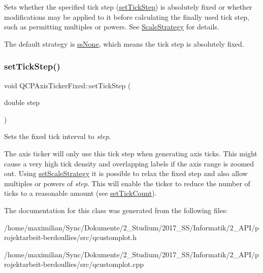 Sets whether the specified tick step (\hyperlink{class_q_c_p_axis_ticker_fixed_a4bc83d85a4f81d4abdd3fa5042d7b833}{set\+Tick\+Step}) is absolutely fixed or whether modifications may be applied to it before calculating the finally used tick step, such as permitting multiples or powers. See \hyperlink{class_q_c_p_axis_ticker_fixed_a15b3d38b935d404b1311eb85cfb6a439}{Scale\+Strategy} for details.

The default strategy is \hyperlink{class_q_c_p_axis_ticker_fixed_a15b3d38b935d404b1311eb85cfb6a439a6621275677a05caa0de204ae3956b85f}{ss\+None}, which means the tick step is absolutely fixed. \mbox{\label{class_q_c_p_axis_ticker_fixed_a4bc83d85a4f81d4abdd3fa5042d7b833}} 
\subsubsection{\texorpdfstring{set\+Tick\+Step()}{setTickStep()}}
{\footnotesize\ttfamily void Q\+C\+P\+Axis\+Ticker\+Fixed\+::set\+Tick\+Step (\begin{DoxyParamCaption}\item[{double}]{step }\end{DoxyParamCaption})}

Sets the fixed tick interval to {\itshape step}.

The axis ticker will only use this tick step when generating axis ticks. This might cause a very high tick density and overlapping labels if the axis range is zoomed out. Using \hyperlink{class_q_c_p_axis_ticker_fixed_acbc7c9bcd80b3dc3edee5f0519d301f6}{set\+Scale\+Strategy} it is possible to relax the fixed step and also allow multiples or powers of {\itshape step}. This will enable the ticker to reduce the number of ticks to a reasonable amount (see \hyperlink{class_q_c_p_axis_ticker_a47752abba8293e6dc18491501ae34008}{set\+Tick\+Count}). 

The documentation for this class was generated from the following files\+:\begin{DoxyCompactItemize}
\item 
/home/maximilian/\+Sync/\+Dokumente/2\+\_\+\+Studium/2017\+\_\+\+S\+S/\+Informatik/2\+\_\+\+A\+P\+I/projektarbeit-\/berdoullies/src/qcustomplot.\+h\item 
/home/maximilian/\+Sync/\+Dokumente/2\+\_\+\+Studium/2017\+\_\+\+S\+S/\+Informatik/2\+\_\+\+A\+P\+I/projektarbeit-\/berdoullies/src/qcustomplot.\+cpp\end{DoxyCompactItemize}
